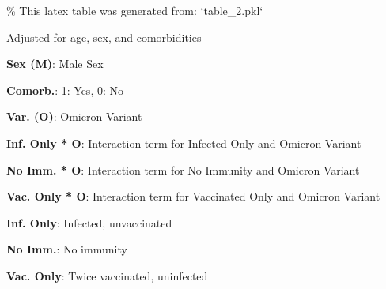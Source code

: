 \documentclass[11pt]{article}
\begin{document}
\begin{codeoutput}
\% This latex table was generated from: `table\_2.pkl`
\begin{table}[h]
\caption{Symptom numbers, immunity group, variant, interaction}
\label{table:symp\_inter}
\begin{threeparttable}
\renewcommand{\TPTminimum}{\linewidth}
\begin{tablenotes}
\footnotesize
\item Adjusted for age, sex, and comorbidities
\item \textbf{Sex (M)}: Male Sex
\item \textbf{Comorb.}: 1: Yes, 0: No
\item \textbf{Var. (O)}: Omicron Variant
\item \textbf{Inf. Only * O}: Interaction term for Infected Only and Omicron Variant
\item \textbf{No Imm. * O}: Interaction term for No Immunity and Omicron Variant
\item \textbf{Vac. Only * O}: Interaction term for Vaccinated Only and Omicron Variant
\item \textbf{Inf. Only}: Infected, unvaccinated
\item \textbf{No Imm.}: No immunity
\item \textbf{Vac. Only}: Twice vaccinated, uninfected
\end{tablenotes}
\end{threeparttable}
\end{table}
\end{codeoutput}
\end{document}
